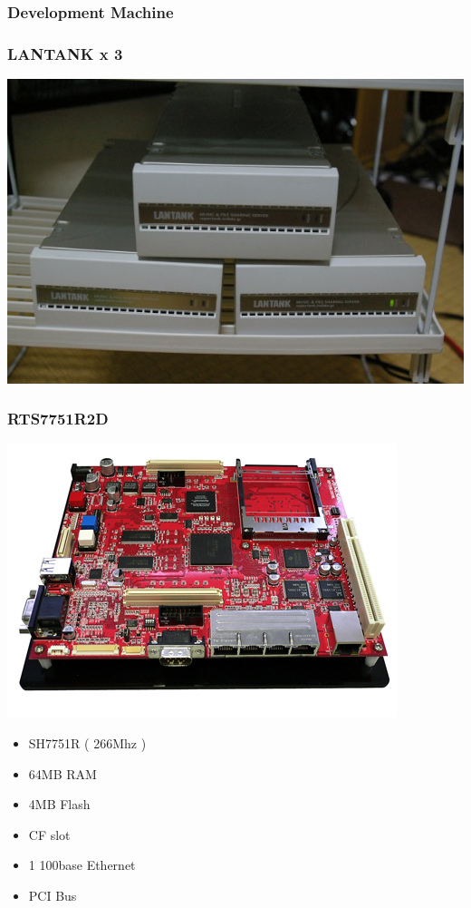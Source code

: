 \documentclass[cjk,dvipdfmx,12pt]{beamer}
\begin{document}
\begin{frame}
 \frametitle{Development Machine}
\end{frame}

\begin{frame}
 \frametitle{LANTANK x 3}
  \begin{center}
  \includegraphics[width=0.7\hsize]{image200705/lantank01.jpg}
  \end{center}
\end{frame}

\begin{frame}
 \frametitle{RTS7751R2D}
 \begin{minipage}[t]{0.4\hsize}
  \includegraphics[width=1.0\hsize]{image200705/r2d.jpg}
 \end{minipage} 
 \begin{minipage}[t]{0.5\hsize}
  \begin{itemize}
   \item SH7751R ( 266Mhz )
   \item 64MB RAM
   \item 4MB Flash 
   \item CF slot 
   \item 1 100base Ethernet
   \item PCI Bus 
  \end{itemize}
 \end{minipage}
\end{frame}
\end{document}

